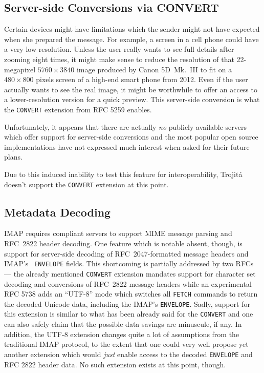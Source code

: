 \documentclass[trojita]{subfiles}
\begin{document}
\subsection{Server-side Conversions via CONVERT}

Certain devices might have limitations which the sender might not have expected when she prepared the message.  For
example, a screen in a cell phone could have a very low resolution.  Unless the user really wants to see full details
after zooming eight times, it might make sense to reduce the resolution of that 22-megapixel $5760 \times 3840$ image
produced by Canon 5D~Mk.~III to fit on a $480 \times 800$ pixels screen of a high-end smart phone from 2012.  Even if
the user actually wants to see the real image, it might be worthwhile to offer an access to a lower-resolution version
for a quick preview.  This server-side conversion is what the {\tt CONVERT} extension from RFC 5259 \cite{rfc5259} enables.

Unfortunately, it appears that there are actually {\em no} publicly available servers which offer support for
server-side conversions and the most popular open source implementations have not expressed much interest when asked for
their future plans.

\begin{trojitabehavior}
Due to this induced inability to test this feature for interoperability, Trojitá doesn't support the {\tt CONVERT}
extension at this point.
\end{trojitabehavior}

\subsection{Metadata Decoding}

IMAP requires compliant servers to support MIME message parsing and RFC~2822 header decoding.  One feature which is
notable absent, though, is support for server-side decoding of RFC~2047-formatted message headers and IMAP's {\tt
ENVELOPE} fields.  This shortcoming is partially addressed by two RFCs --- the already mentioned {\tt CONVERT} extension
mandates support for character set decoding and conversions of RFC~2822 message headers while an experimental RFC 5738
\cite{rfc5738} adds an ``UTF-8'' mode which switches all {\tt FETCH} commands to return the decoded Unicode data,
including the IMAP's {\tt ENVELOPE}.  Sadly, support for this extension is similar to what has been already said for the
{\tt CONVERT} and one can also safely claim that the possible data savings are minuscule, if any.  In addition, the
UTF-8 extension changes quite a lot of assumptions from the traditional IMAP protocol, to the extent that one could very
well propose yet another extension which would {\em just} enable access to the decoded {\tt ENVELOPE} and RFC 2822
header data.  No such extension exists at this point, though.
\end{document}
